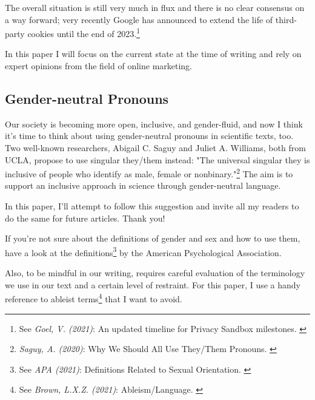 The overall situation is still very much in flux and there is no clear consensus on a way forward; very recently Google has announced to extend the life of third-party cookies until the end of 2023.\footnote{See \textit{Goel, V. (2021)}: An updated timeline for Privacy Sandbox milestones. \cite{sandboxDelay}}

In this paper I will focus on the current state at the time of writing and rely on expert opinions from the field of online marketing.

\subsection{Gender-neutral Pronouns}

Our society is becoming more open, inclusive, and gender-fluid, and now I think it's time to think about using gender-neutral pronouns in scientific texts, too. Two well-known researchers, Abigail C. Saguy and Juliet A. Williams, both from UCLA, propose to use singular they/them instead: "The universal singular they is inclusive of people who identify as male, female or nonbinary."\footnote{\textit{Saguy, A. (2020)}: Why We Should All Use They/Them Pronouns. \cite{pronouns}} The aim is to support an inclusive approach in science through gender-neutral language. 

In this paper, I'll attempt to follow this suggestion and invite all my readers to do the same for future articles. Thank you!

If you're not sure about the definitions of gender and sex and how to use them, have a look at the definitions\footnote{See \textit{APA (2021)}: Definitions Related to Sexual Orientation. \cite{apaDefinitions}} by the American Psychological Association.

Also, to be mindful in our writing, requires careful evaluation of the terminology we use in our text and a certain level of restraint. For this paper, I use a handy reference to ableist terms\footnote{See \textit{Brown, L.X.Z. (2021)}: Ableism/Language. \cite{ableismLanguage}} that I want to avoid.
